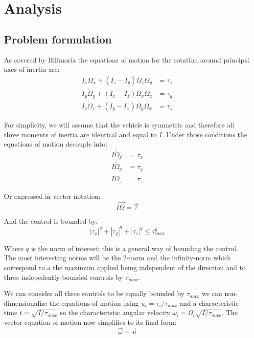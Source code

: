 \section{Analysis}

\subsection{Problem formulation}
As covered by Bilimoria the equations of motion for the rotation around principal axes of inertia are:
\begin{align}
I_x \dot{\Omega}_x + (I_z-I_y) \Omega_z \Omega_y &= \tau_x \\
I_y \dot{\Omega}_y + (I_x-I_z) \Omega_x \Omega_z &= \tau_y \\
I_z \dot{\Omega}_z + (I_y-I_x) \Omega_y \Omega_x &= \tau_z 
\end{align}

For simplicity, we will assume that the vehicle is symmetric and therefore all three moments of inertia are identical and equal to $I$. Under those conditions the equations of motion decouple into:
\begin{align}
I \dot{\Omega}_x &= \tau_x \\
I \dot{\Omega}_y &= \tau_y \\
I \dot{\Omega}_z &= \tau_z 
\end{align}

Or expressed in vector notation:
\begin{equation}
I \vec{\Omega} = \vec{\tau}
\end{equation}

And the control is bounded by:
\begin{equation}
|\tau_x|^q + |\tau_y|^q + |\tau_z|^q \leq \tau_{max}^q
\end{equation}

Where $q$ is the norm of interest; this is a general way of bounding the control.  The most interesting norms will be the 2-norm and the infinity-norm which correspond to a the maximum applied being independent of the direction and to three indepedently bounded controls by $\tau_{max}$.

We can consider all three controls to be equally bounded by $\tau_{max}$ we can non-dimensionalize the equations of motion using $u_i = \tau_i / \tau_{max}$ and a characteristic time $t=\sqrt{I / \tau_{max}}$ so the characteristic angular velocity $\omega_i = \Omega_i \sqrt{I / \tau_{max}}$. The vector equation of motion now simplifies to its final form:
\begin{equation}
\label{omegadot}
\vec{\omega} = \vec{u}
\end{equation}

